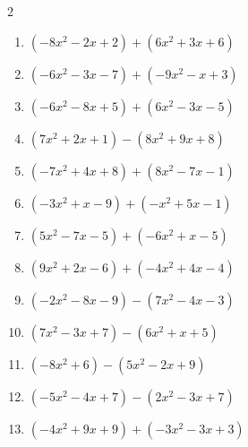 \begin{multicols}{2}
\begin{enumerate}
  \item $(-8x^{2}-2x+2)+(6x^{2}+3x+6)$


  \item $(-6x^{2}-3x-7)+(-9x^{2}-x+3)$


  \item $(-6x^{2}-8x+5)+(6x^{2}-3x-5)$

        \phantom{$=-11x$}

  \item $(7x^{2}+2x+1)-(8x^{2}+9x+8)$


\columnbreak %

\resetques

  \item $(-7x^{2}+4x+8)+(8x^{2}-7x-1)$


  \item $(-3x^{2}+x-9)+(-x^{2}+5x-1)$


  \item $(5x^{2}-7x-5)+(-6x^{2}+x-5)$


  \item $(9x^{2}+2x-6)+(-4x^{2}+4x-4)$


  \item $(-2x^{2}-8x-9)-(7x^{2}-4x-3)$


  \item $(7x^{2}-3x+7)-(6x^{2}+x+5)$


  \item $(-8x^{2}+6)-(5x^{2}-2x+9)$


  \item $(-5x^{2}-4x+7)-(2x^{2}-3x+7)$


  \item $(-4x^{2}+9x+9)+(-3x^{2}-3x+3)$



\end{enumerate}
\end{multicols}

